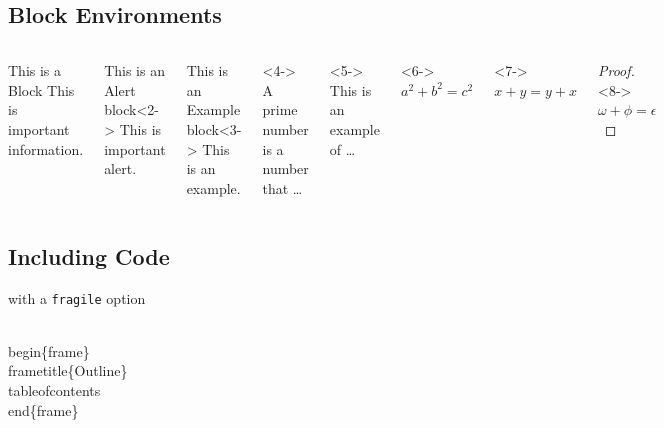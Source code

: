 \documentclass[
        handout,
        ]{beamer}
\begin{document}
\subsection{Block Environments}
\begin{frame}[t]{\subsecname} %
    \begin{columns}
        \begin{block}{This is a Block}
            This is important information.
        \end{block}
        \begin{alertblock}{This is an Alert block}<2->
            This is important alert.
        \end{alertblock}
        \begin{exampleblock}{This is an Example block}<3->
            This is an example.
        \end{exampleblock}
        \begin{definition}<4->
            A prime number is a number that \ldots
        \end{definition}
        \begin{example}<5->
            This is an example of \ldots
        \end{example}
        \begin{theorem}<6->
            $ a^2 + b^2 = c^2 $
        \end{theorem}
        \begin{corollary}<7->
            $ x + y = y + x $
        \end{corollary}
        \begin{proof}<8->
            $\omega +\phi = \epsilon $
        \end{proof}
    \end{columns}
\end{frame}

\subsection{Including Code}
\begin{frame}[fragile]{\subsecname with a \texttt{fragile} option} %
    \begin{semiverbatim}
\\begin\{frame\}
\\frametitle\{Outline\}
\\tableofcontents
\\end\{frame\}
    \end{semiverbatim}
\end{frame}
\end{document}
